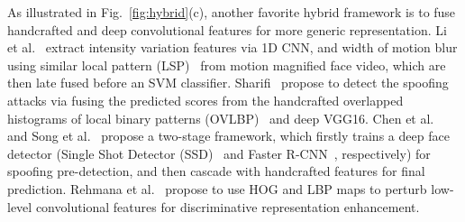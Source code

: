 \documentclass[10pt,journal,compsoc]{IEEEtran}
\begin{document}
As illustrated in Fig.~\ref{fig:hybrid}(c), another favorite hybrid framework is to fuse handcrafted and deep convolutional features for more generic representation. Li et al.~\cite{li2019replayed} extract intensity variation features via 1D CNN, and width of motion blur using similar local pattern (LSP)~\cite{li2019replayed} from motion magnified face video, which are then late fused before an SVM classifier. Sharifi~\cite{sharifi2019score} propose to detect the spoofing attacks via fusing the predicted scores from the handcrafted overlapped histograms of local binary patterns (OVLBP)~\cite{guo2010completed} and deep VGG16. Chen et al.~\cite{chen2019cascade} and Song et al.~\cite{song2019discriminative} propose a two-stage framework, which firstly trains a deep face detector (Single Shot Detector (SSD)~\cite{liu2016ssd} and Faster R-CNN~\cite{ren2016faster}, respectively) for spoofing pre-detection, and then cascade with handcrafted features for final prediction. Rehmana et al.~\cite{rehman2019perturbing,rehman2020enhancing} propose to use HOG and LBP maps to perturb low-level convolutional features for discriminative representation enhancement.    
\end{document}
